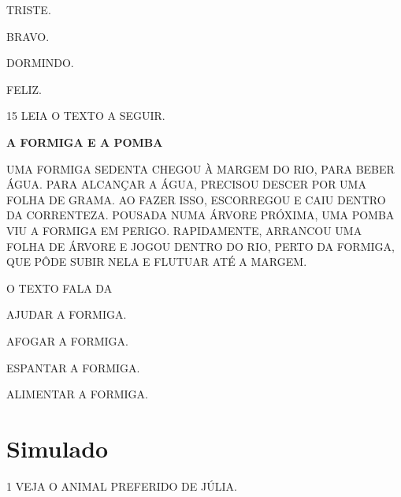 \begin{escolha}

\item TRISTE.

\item BRAVO.

\item DORMINDO.

\item FELIZ.

\end{escolha}

\num{15} LEIA O TEXTO A SEGUIR.

\begin{myquote}
\textbf{A FORMIGA E A POMBA}

UMA FORMIGA SEDENTA CHEGOU À MARGEM DO RIO, PARA BEBER
ÁGUA. PARA ALCANÇAR A ÁGUA, PRECISOU DESCER POR UMA FOLHA DE
GRAMA. AO FAZER ISSO, ESCORREGOU E CAIU DENTRO DA CORRENTEZA.
POUSADA NUMA ÁRVORE PRÓXIMA, UMA POMBA VIU A
FORMIGA EM PERIGO. RAPIDAMENTE, ARRANCOU UMA FOLHA DE
ÁRVORE E JOGOU DENTRO DO RIO, PERTO DA FORMIGA, QUE PÔDE SUBIR
NELA E FLUTUAR ATÉ A MARGEM.

\end{myquote}

O TEXTO FALA DA

\begin{escolha}

\item AJUDAR A FORMIGA.

\item AFOGAR A FORMIGA.

\item ESPANTAR A FORMIGA.

\item ALIMENTAR A FORMIGA.

\end{escolha}

\chapter[Simulado 4]{Simulado}

\num{1} VEJA O ANIMAL PREFERIDO DE JÚLIA.

